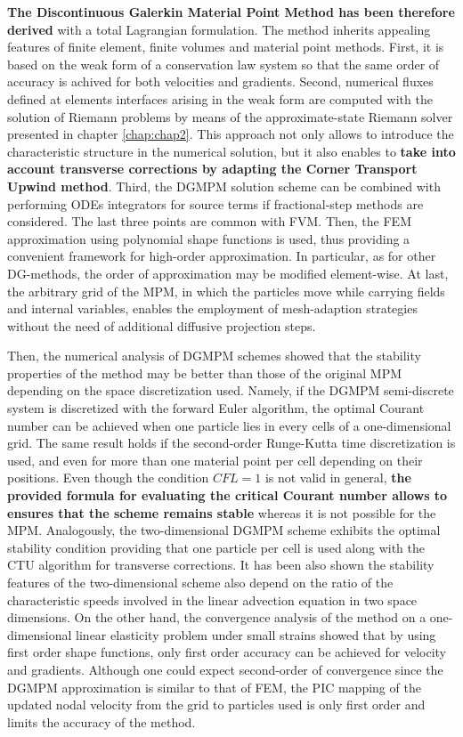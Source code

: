 \textbf{The Discontinuous Galerkin Material Point Method has been therefore derived} with a total Lagrangian formulation.
The method inherits appealing features of finite element, finite volumes and material point methods.
First, it is based on the weak form of a conservation law system so that the same order of accuracy is achived for both velocities and gradients.
Second, numerical fluxes defined at elements interfaces arising in the weak form are computed with the solution of Riemann problems by means of the approximate-state Riemann solver presented in chapter \ref{chap:chap2}.
This approach not only allows to introduce the characteristic structure in the numerical solution, but it also enables to \textbf{take into account transverse corrections by adapting the Corner Transport Upwind method}.
Third, the DGMPM solution scheme can be combined with performing ODEs integrators for source terms if fractional-step methods are considered. 
The last three points are common with FVM.
Then, the FEM approximation using polynomial shape functions is used, thus providing a convenient framework for high-order approximation.
In particular, as for other DG-methods, the order of approximation may be modified element-wise.
At last, the arbitrary grid of the MPM, in which the particles move while carrying fields and internal variables, enables the employment of mesh-adaption strategies without the need of additional diffusive projection steps.

Then, the numerical analysis of DGMPM schemes showed that the stability properties of the method may be better than those of the original MPM depending on the space discretization used.
Namely, if the DGMPM semi-discrete system is discretized with the forward Euler algorithm, the optimal Courant number can be achieved when one particle lies in every cells of a one-dimensional grid.
The same result holds if the second-order Runge-Kutta time discretization is used, and even for more than one material point per cell depending on their positions.
Even though the condition $CFL=1$ is not valid in general, \textbf{the provided formula for evaluating the critical Courant number allows to ensures that the scheme remains stable} whereas it is not possible for the MPM. 
Analogously, the two-dimensional DGMPM scheme exhibits the optimal stability condition providing that one particle per cell is used along with the CTU algorithm for transverse corrections.
It has been also shown the stability features of the two-dimensional scheme also depend on the ratio of the characteristic speeds involved in the linear advection equation in two space dimensions. 
On the other hand, the convergence analysis of the method on a one-dimensional linear elasticity problem under small strains showed that by using first order shape functions, only first order accuracy can be achieved for velocity and gradients.
Although one could expect second-order of convergence since the DGMPM approximation is similar to that of FEM, the PIC mapping of the updated nodal velocity from the grid to particles used is only first order and limits the accuracy of the method.

